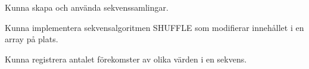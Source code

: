 
\item Kunna skapa och använda sekvenssamlingar.
\item Kunna implementera sekvensalgoritmen SHUFFLE som modifierar innehållet i en array på plats.
\item Kunna registrera antalet förekomster av olika värden i en sekvens.
